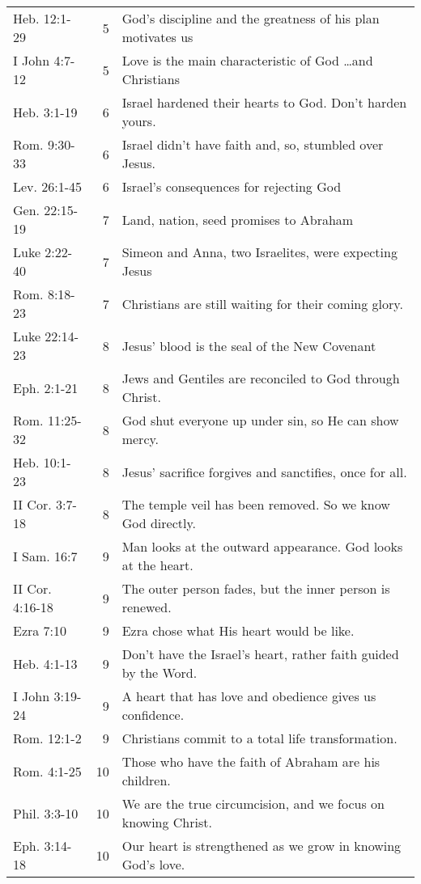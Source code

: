 \begin{table}[h]
\begin{tabular}{lrp{11cm}}
Heb. 12:1-29    & 5  & God's discipline and the greatness of his plan motivates us\\
I John 4:7-12   & 5  & Love is the main characteristic of God \ldots and Christians\\
Heb. 3:1-19     & 6  & Israel hardened their hearts to God.  Don't harden yours.\\
Rom. 9:30-33    & 6  & Israel didn't have faith and, so, stumbled over Jesus.\\
Lev. 26:1-45    & 6  & Israel's consequences for rejecting God\\
Gen. 22:15-19   & 7  & Land, nation, seed promises to Abraham\\
Luke 2:22-40    & 7  & Simeon and Anna, two Israelites, were expecting Jesus\\
Rom. 8:18-23    & 7  & Christians are still waiting for their coming glory.\\
Luke 22:14-23   & 8  & Jesus' blood is the seal of the New Covenant\\
Eph. 2:1-21     & 8  & Jews and Gentiles are reconciled to God through Christ.\\
Rom. 11:25-32   & 8  & God shut everyone up under sin, so He can show mercy.\\
Heb. 10:1-23    & 8  & Jesus' sacrifice forgives and sanctifies, once for all.\\
II Cor. 3:7-18  & 8  & The temple veil has been removed.  So we know God directly.\\
I Sam. 16:7     & 9  & Man looks at the outward appearance.  God looks at the heart.\\
II Cor. 4:16-18 & 9  & The outer person fades, but the inner person is renewed.\\
Ezra 7:10       & 9  & Ezra chose what His heart would be like.\\
Heb. 4:1-13     & 9  & Don't have the Israel's heart, rather faith guided by the Word.\\
I John 3:19-24  & 9  & A heart that has love and obedience gives us confidence.\\
Rom. 12:1-2     & 9  & Christians commit to a total life transformation.\\
Rom. 4:1-25     & 10 & Those who have the faith of Abraham are his children.\\
Phil. 3:3-10    & 10 & We are the true circumcision, and we focus on knowing Christ.\\Eph. 3:14-18    & 10 & Our heart is strengthened as we grow in knowing God's love.\\

\end{tabular}
\end{table}
